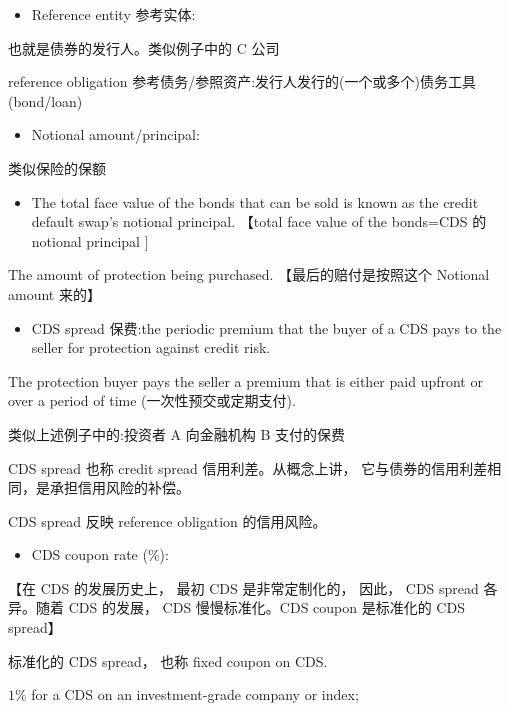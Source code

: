 \begin{itemize}
\item Reference entity 参考实体:
\end{itemize}

也就是债券的发行人。类似例子中的 C 公司

 reference obligation 参考债务/参照资产:发行人发行的(一个或多个)债务工具(bond/loan)

\begin{itemize}
\item Notional amount/principal:
\end{itemize}

 类似保险的保额

\begin{itemize}
\item The total face value of the bonds that can be sold is known as the credit default swap's notional principal. 【total face value of the bonds=CDS 的 notional principal \(\rbrack\)
\end{itemize}

 The amount of protection being purchased. 【最后的赔付是按照这个 Notional amount 来的】

\begin{itemize}
\item CDS spread 保费:the periodic premium that the buyer of a CDS pays to the seller for protection against credit risk.
\end{itemize}

 The protection buyer pays the seller a premium that is either paid upfront or over a period of time (一次性预交或定期支付).

类似上述例子中的:投资者 A 向金融机构 B 支付的保费

 CDS spread 也称 credit spread 信用利差。从概念上讲， 它与债券的信用利差相同，是承担信用风险的补偿。

 CDS spread 反映 reference obligation 的信用风险。

\begin{itemize}
\item CDS coupon rate (\%):
\end{itemize}

【在 CDS 的发展历史上， 最初 CDS 是非常定制化的， 因此， CDS spread 各异。随着 CDS 的发展， CDS 慢慢标准化。CDS coupon 是标准化的 CDS spread】

 标准化的 CDS spread， 也称 fixed coupon on CDS.

\(1\%\) for a CDS on an investment-grade company or index;

